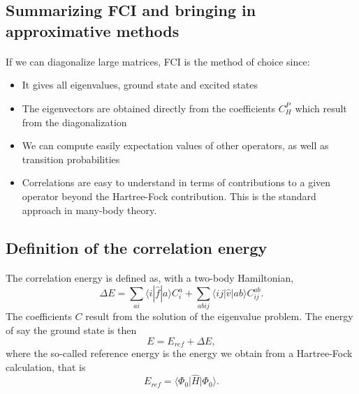 \subsection*{Summarizing FCI and bringing in approximative methods}

\paragraph{}

If we can diagonalize large matrices, FCI is the method of choice since:
\begin{itemize}
\item It gives all eigenvalues, ground state and excited states

\item The eigenvectors are obtained directly from the coefficients $C_H^P$ which result from the diagonalization

\item We can compute easily expectation values of other operators, as well as transition probabilities

\item Correlations are easy to understand in terms of contributions to a given operator beyond the Hartree-Fock contribution. This is the standard approach in  many-body theory. 
\end{itemize}

\noindent



\subsection*{Definition of the correlation energy}

\paragraph{}
The correlation energy is defined as, with a two-body Hamiltonian,  
\[
\Delta E=\sum_{ai}\langle i| \hat{f}|a \rangle C_{i}^{a}+
\sum_{abij}\langle ij | \hat{v}| ab \rangle C_{ij}^{ab}.
\]
The coefficients $C$ result from the solution of the eigenvalue problem. 
The energy of say the ground state is then
\[
E=E_{ref}+\Delta E,
\]
where the so-called reference energy is the energy we obtain from a Hartree-Fock calculation, that is
\[
E_{ref}=\langle \Phi_0 \vert \hat{H} \vert \Phi_0 \rangle.
\]



